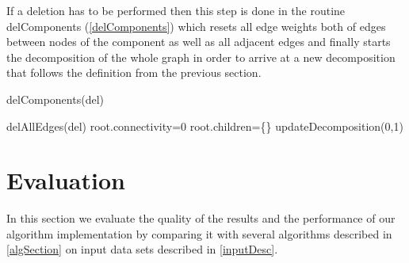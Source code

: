 \documentclass[a4paper,xcolor=dvipsnames, tikz, 12pt]{article}
\theoremstyle{definition}
\begin{document}
If a deletion has to be performed then this step is done in the routine delComponents (\cref{delComponents}) which resets all edge weights both of edges between nodes of the component as well as all adjacent edges and finally starts the decomposition of the whole graph in order to arrive at a new decomposition that follows the definition from the previous section.



\begin{algorithm}
	\caption{delComponents(del)}
	\label{delComponents}
	\begin{algorithmic}
		\STATE delAllEdges(del)
		\STATE root.connectivity=0
		\STATE root.children=\{\}
		\STATE updateDecomposition(0,1)
	\end{algorithmic}
\end{algorithm}


\begin{comment}
\begin{itemize}
	\item \cref{insertAndUpdate} calls the other routines as needed
	\item \cref{updateDecomposition} starts at the smallest subgraph containing the nodes a and b in the decomposition tree and computes a new decomposition of the subgraph. Specifically it uses the decomposition approach from \cite{Chang2013} to decompose one subgraph and then also computes the subgraphs with the next higher connectivity and recurses until the connectivity has reached alpha.
	\item updateMapping checks whether the alphaConnectedComponents were changed. If yes then it either collocates them if the resulting component is small enough or it adds the component to its return value. Then all the returned components are deleted, i.e. the edges connecting its nodes are deleted and the decomposition is recomputed
	\item this deletion is performed by \cref{delComponents}
\end{itemize}
\end{comment}


\section{Evaluation}
In this section we evaluate the quality of the results and the performance of our algorithm implementation by comparing it with several algorithms described in \cref{algSection} on input data sets described in \cref{inputDesc}.
\end{document}
